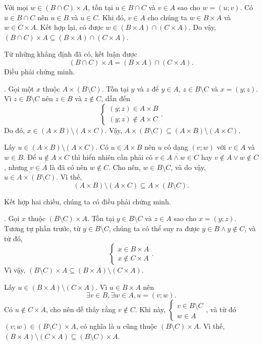Với mọi $w \in (B \cap C) \times A$, tồn tại $u \in B \cap C$ và $v \in A$ sao cho $w = (u; v)$. Có $u \in B \cap C$ nên $u \in B$ và $u \in C$. Khi đó, $v \in A$ cho chúng ta $w \in B \times A$ và $w \in C \times A$. Kết hợp lại, có được $w \in (B \times A) \cap (C \times A)$. Do vậy, $(B \cap C) \times A \subseteq (B \times A) \cap (C \times A)$.

Từ những khẳng định đã có, kết luận được $$(B \cap C) \times A = (B \times A) \cap (C \times A).$$ Điều phải chứng minh.

. Gọi một $x$ thuộc $A \times (B \setminus C)$. Tồn tại $y$ và $z$ để $y \in A$, $z \in B \setminus C$ và $x = (y; z)$. Vì $z \in B \setminus C$ nên $z \in B$ và $z \notin C$, dẫn đến $$\begin{cases}
   (y; z) \in A \times B \\
   (y; z) \notin A \times C
\end{cases}.$$ Do đó, $x \in (A \times B) \setminus (A \times C)$. Vậy, $A \times (B \setminus C) \subseteq (A \times B) \setminus (A \times C)$.

Lấy $u \in (A \times B) \setminus (A \times C)$. Có $u \in A \times B$ nên $u$ có dạng $(v; w)$ với $v \in A$ và $w \in B$. Để $u \notin A \times C$ thì hiển nhiên cần phải có $\overline{v \in A \land w \in C}$ hay $v \notin A \lor w \notin C$, nhưng $v \in A$ là đã có nên $w \notin C$. Cho nên, $w \in B \setminus C$, và do vậy, $u \in A \times (B \setminus C)$. Vì thế, $$(A \times B) \setminus (A \times C) \subseteq A \times (B \setminus C).$$

Kết hợp hai chiều, chúng ta có điều phải chứng minh.

. Gọi $x$ thuộc $(B \setminus C) \times A$. Tồn tại $y \in B \setminus C$ và $z \in A$ sao cho $x = (y; z)$. Tương tự phần trước, từ $y \in B \setminus C$, chúng ta có thể suy ra được $y \in B \land y \notin C$, và từ đó, $$\begin{cases}
   x \in B \times A \\
   x \notin C \times A
\end{cases}.$$ Vì vậy, $(B \setminus C) \times A \subseteq (B \times A) \setminus (C \times A)$.

Lấy $u \in (B \times A) \setminus (C \times A)$. Vì $u \in B \times A$ nên $$\exists v \in B, \exists w \in A, u = (v; w).$$
Có $u \notin C \times A$, cho nên dễ thấy rằng $v \notin C$. Khi này, $\begin{cases}
   v \in B \setminus C \\
   w \in A
\end{cases}$, và từ đó $(v; w) \in (B \setminus C) \times A$, có nghĩa là $u$ cũng thuộc $(B \setminus C) \times A$. Vì thế, $(B \times A) \setminus (C \times A) \subseteq (B \setminus C) \times A.$


